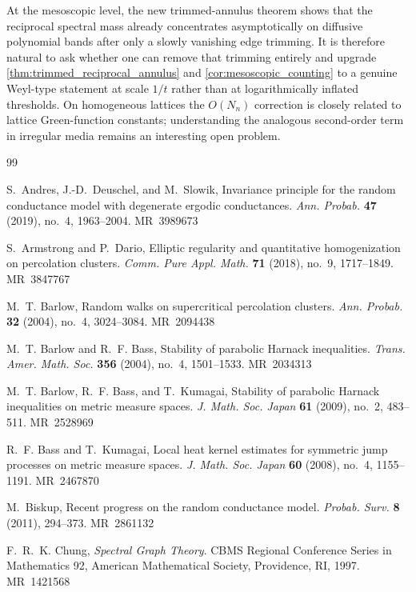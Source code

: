 \documentclass[reqno]{amsart}
\providecommand{\MR}[1]{\textsc{MR}~#1}
\numberwithin{equation}{section}
\theoremstyle{definition}
\theoremstyle{remark}
\newcommand{\Cref}[1]{\autoref{#1}}
\begin{document}
At the mesoscopic level, the new trimmed-annulus theorem shows that the reciprocal spectral mass already concentrates asymptotically on diffusive polynomial bands after only a slowly vanishing edge trimming. It is therefore natural to ask whether one can remove that trimming entirely and upgrade \Cref{thm:trimmed_reciprocal_annulus} and \Cref{cor:mesoscopic_counting} to a genuine Weyl-type statement at scale $1/t$ rather than at logarithmically inflated thresholds. On homogeneous lattices the $O(N_n)$ correction is closely related to lattice Green-function constants; understanding the analogous second-order term in irregular media remains an interesting open problem.



\begin{thebibliography}{99}

S.~Andres, J.-D.~Deuschel, and M.~Slowik, Invariance principle for the random conductance model with degenerate ergodic conductances.
\emph{Ann. Probab.} \textbf{47} (2019), no.~4, 1963--2004.
\MR{3989673}


S.~Armstrong and P.~Dario, Elliptic regularity and quantitative homogenization on percolation clusters.
\emph{Comm. Pure Appl. Math.} \textbf{71} (2018), no.~9, 1717--1849.
\MR{3847767}

M.~T. Barlow, Random walks on supercritical percolation clusters.
\emph{Ann. Probab.} \textbf{32} (2004), no.~4, 3024--3084.
\MR{2094438}

M.~T. Barlow and R.~F. Bass, Stability of parabolic Harnack inequalities.
\emph{Trans. Amer. Math. Soc.} \textbf{356} (2004), no.~4, 1501--1533.
\MR{2034313}

M.~T. Barlow, R.~F. Bass, and T.~Kumagai, Stability of parabolic Harnack inequalities on metric measure spaces.
\emph{J. Math. Soc. Japan} \textbf{61} (2009), no.~2, 483--511.
\MR{2528969}

R.~F. Bass and T.~Kumagai, Local heat kernel estimates for symmetric jump processes on metric measure spaces.
\emph{J. Math. Soc. Japan} \textbf{60} (2008), no.~4, 1155--1191.
\MR{2467870}

M.~Biskup, Recent progress on the random conductance model.
\emph{Probab. Surv.} \textbf{8} (2011), 294--373.
\MR{2861132}

F.~R.~K. Chung, \emph{Spectral Graph Theory}.
CBMS Regional Conference Series in Mathematics 92, American Mathematical Society, Providence, RI, 1997.
\MR{1421568}


\end{thebibliography}
\end{document}
